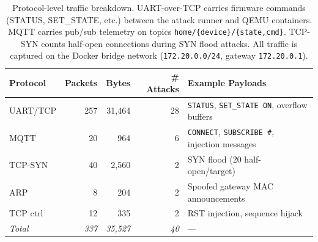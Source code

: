 \begin{table}[t]
  \centering
  \caption{Protocol-level traffic breakdown.
  UART-over-TCP carries firmware commands (STATUS, SET\_STATE, etc.)
  between the attack runner and QEMU containers.
  MQTT carries pub/sub telemetry on topics
  \texttt{home/\{device\}/\{state,cmd\}}.
  TCP-SYN counts half-open connections during SYN flood attacks.
  All traffic is captured on the Docker bridge network
  (\texttt{172.20.0.0/24}, gateway \texttt{172.20.0.1}).}
  \label{tab:protocol-breakdown}
  \small
  \begin{tabular}{@{}l r r r l@{}}
    \toprule
    {Protocol} & {Packets} & {Bytes} & {\# Attacks} & {Example Payloads} \\
    \midrule
    UART/TCP & 257 & 31,464 & 28 & \texttt{STATUS}, \texttt{SET\_STATE ON}, overflow buffers \\
    MQTT     &  20 &    964 &  6 & \texttt{CONNECT}, \texttt{SUBSCRIBE \#}, injection messages \\
    TCP-SYN  &  40 &  2,560 &  2 & SYN flood (20 half-open/target) \\
    ARP      &   8 &    204 &  2 & Spoofed gateway MAC announcements \\
    TCP ctrl &  12 &    335 &  2 & RST injection, sequence hijack \\
    \midrule
    \textit{Total} & \textit{337} & \textit{35,527} & \textit{40} & --- \\
    \bottomrule
  \end{tabular}
\end{table}

